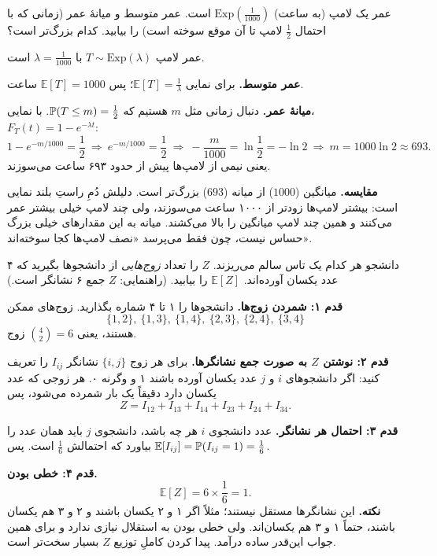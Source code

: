 \begin{exercise}
  عمر یک لامپ (به ساعت) $\mathrm{Exp}(\tfrac1{1000})$ است. عمر متوسط و میانهٔ عمر (زمانی که با احتمال $\tfrac12$ لامپ تا آن موقع سوخته است) را بیابید. کدام بزرگ‌تر است؟
  \begin{solution}
    عمر لامپ $T\sim\mathrm{Exp}(\lambda)$ با $\lambda=\frac1{1000}$ است.

    \textbf{عمر متوسط.} برای نمایی $\mathbb E[T]=\frac1\lambda$؛ پس $\mathbb E[T]=1000$ ساعت.

    \textbf{میانهٔ عمر.} دنبال زمانی مثل $m$ هستیم که $\P(T\le m)=\frac12$. با  نمایی، $F_T(t)=1-e^{-\lambda t}$:
    \[ 1-e^{-m/1000}=\frac12\ \Longrightarrow\ e^{-m/1000}=\frac12\ \Longrightarrow\ -\frac{m}{1000}=\ln\frac12=-\ln2\ \Longrightarrow\ m=1000\ln2\approx693. \]
    یعنی نیمی از لامپ‌ها پیش از حدود ۶۹۳ ساعت می‌سوزند.

    \textbf{مقایسه.} میانگین ($1000$) از میانه ($693$) بزرگ‌تر است. دلیلش دُمِ راستِ بلند نمایی است: بیشتر لامپ‌ها زودتر از ۱۰۰۰ ساعت می‌سوزند، ولی چند لامپ خیلی بیشتر عمر می‌کنند و همین چند لامپ میانگین را بالا می‌کشند. میانه به این مقدارهای خیلی بزرگ حساس نیست، چون فقط می‌پرسد «نصف لامپ‌ها کجا سوخته‌اند».
  \end{solution}
\end{exercise}

\begin{exercise}
  ۴ دانشجو هر کدام یک تاس سالم می‌ریزند. $Z$ را تعداد \emph{زوج‌هایی} از دانشجوها بگیرید که عدد یکسان آورده‌اند. $\mathbb E[Z]$ را بیابید. (راهنمایی: $Z$ جمع ۶ نشانگر است.)
  \begin{solution}
    \textbf{قدم ۱: شمردن زوج‌ها.} دانشجوها را ۱ تا ۴ شماره بگذارید. زوج‌های ممکن
    \[ \{1,2\},\ \{1,3\},\ \{1,4\},\ \{2,3\},\ \{2,4\},\ \{3,4\} \]
    هستند، یعنی $\binom42=6$ زوج.

    \textbf{قدم ۲: نوشتن $Z$ به صورت جمع نشانگرها.} برای هر زوج $\{i,j\}$ نشانگر $I_{ij}$ را تعریف کنید: اگر دانشجوهای $i$ و $j$ عدد یکسان آورده باشند ۱ و وگرنه ۰. هر زوجی که عدد یکسان دارد دقیقاً یک بار شمرده می‌شود، پس
    \[ Z=I_{12}+I_{13}+I_{14}+I_{23}+I_{24}+I_{34}. \]

    \textbf{قدم ۳: احتمال هر نشانگر.} عدد دانشجوی $i$ هر چه باشد، دانشجوی $j$ باید همان عدد را بیاورد که احتمالش $\frac16$ است. پس $\mathbb E[I_{ij}]=\P(I_{ij}=1)=\frac16$.

    \textbf{قدم ۴: خطی بودن.}
    \[ \mathbb E[Z]=6\times\frac16=1. \]
    \textbf{نکته.} این نشانگرها مستقل نیستند؛ مثلاً اگر ۱ و ۲ یکسان باشند و ۲ و ۳ هم یکسان باشند، حتماً ۱ و ۳ هم یکسان‌اند. ولی خطی بودن به استقلال نیازی ندارد و برای همین جواب این‌قدر ساده درآمد. پیدا کردن کاملِ توزیع $Z$ بسیار سخت‌تر است.
  \end{solution}
\end{exercise}

